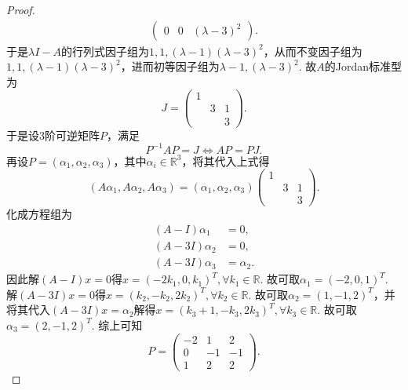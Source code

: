 \documentclass[../../main.tex]{subfiles}
\begin{document}
\begin{proof}
\begin{align*}
\begin{pmatrix}
0 & 0 & (\lambda - 3)^2
\end{pmatrix}.
\end{align*}
于是$\lambda I - A$的行列式因子组为$1, 1, (\lambda - 1)(\lambda - 3)^2$，从而不变因子组为$1, 1, (\lambda - 1)(\lambda - 3)^2$，进而初等因子组为$\lambda - 1, (\lambda - 3)^2$.
故$A$的Jordan标准型为
\[
J = 
\begin{pmatrix}
1 & & \\
& 3 & 1 \\
& & 3
\end{pmatrix}.
\]
于是设3阶可逆矩阵$P$，满足
\[
P^{-1}AP = J \Longleftrightarrow AP = PJ.
\]
再设$P = (\alpha_1, \alpha_2, \alpha_3)$，其中$\alpha_i \in \mathbb{R}^3$，将其代入上式得
\[
(A\alpha_1, A\alpha_2, A\alpha_3) = (\alpha_1, \alpha_2, \alpha_3)
\begin{pmatrix}
1 & & \\
& 3 & 1 \\
& & 3
\end{pmatrix}.
\]
化成方程组为
\begin{align*}
(A - I)\alpha_1 &= 0, \\
(A - 3I)\alpha_2 &= 0, \\
(A - 3I)\alpha_3 &= \alpha_2.
\end{align*}
因此解$(A - I)x = 0$得$x = (-2k_1, 0, k_1)^T, \forall k_1 \in \mathbb{R}$. 故可取$\alpha_1 = (-2, 0, 1)^T$. 解$(A - 3I)x = 0$得$x = (k_2, -k_2, 2k_2)^T, \forall k_2 \in \mathbb{R}$. 故可取$\alpha_2 = (1, -1, 2)^T$，并将其代入$(A - 3I)x = \alpha_2$解得$x = (k_3 + 1, -k_3, 2k_3)^T, \forall k_3 \in \mathbb{R}$. 故可取$\alpha_3 = (2, -1, 2)^T$.
综上可知
\[
P = 
\begin{pmatrix}
-2 & 1 & 2 \\
0 & -1 & -1 \\
1 & 2 & 2
\end{pmatrix}.
\]
\end{proof}
\end{document}

